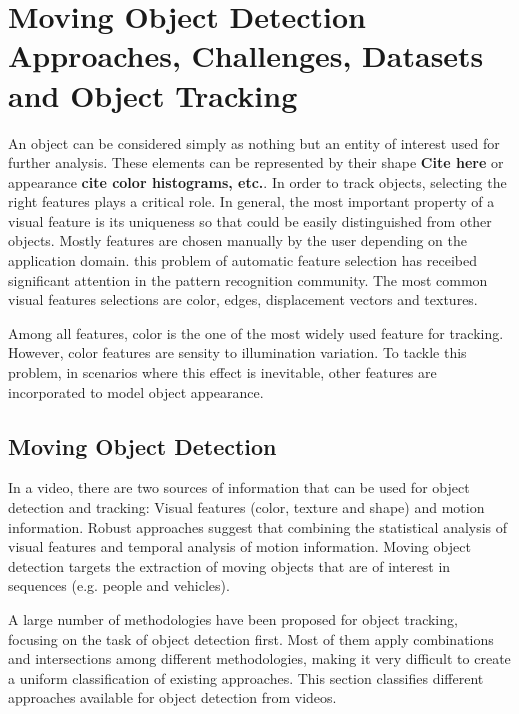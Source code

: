 
\chapter{Moving Object Detection Approaches, Challenges, Datasets and Object Tracking} %

\label{chapter2} %


An object can be considered simply as nothing but an entity of interest used for further analysis. These elements can be represented by their shape \textbf{Cite here} or appearance \textbf{cite color histograms, etc.}. In order to track objects, selecting the right features plays a critical role. In general, the most important property of a visual feature is its uniqueness so that could be easily distinguished from other objects. Mostly features are chosen manually by the user depending on the application domain. this problem of automatic feature selection has receibed significant attention in the pattern recognition community. The most common visual features selections are color, edges, displacement vectors and textures.

Among all features, color is the one of the most widely used feature for tracking. However, color features are sensity to illumination variation. To tackle this problem, in scenarios where this effect is inevitable, other features are incorporated to model object appearance.

\section{Moving Object Detection}

In a video, there are two sources of information that can be used for object detection and tracking: Visual features (color, texture and shape) and motion information. Robust approaches suggest that combining the statistical analysis of visual features and temporal analysis of motion information. Moving object detection targets the extraction of moving objects that are of interest in sequences (e.g. people and vehicles).

A large number of methodologies have been proposed for object tracking, focusing on the task of object detection first. Most of them apply combinations and intersections among different methodologies, making it very difficult to create a uniform classification of existing approaches. This section classifies different approaches available for object detection from videos.

